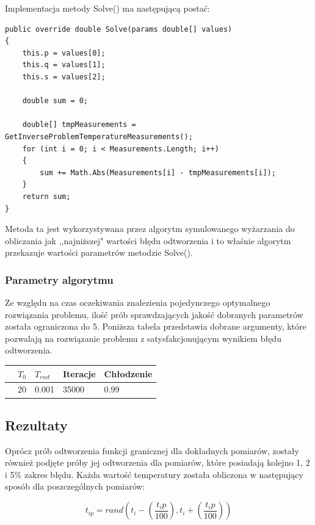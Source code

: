 \documentclass[twoside]{projektInzynierskiMS1}
\newcounter{rowcnt}
\newcommand\rownum{\ifnumequal{\value{rowcnt}}{0}{\textbf{Nr.}}{\therowcnt.}\refstepcounter{rowcnt}}
\newcommand{\si}{ś}
\begin{document}
Implementacja metody Solve() ma następującą postać:

\begin{verbatim}
public override double Solve(params double[] values)
{
    this.p = values[0];
    this.q = values[1];
    this.s = values[2];

    double sum = 0;

    double[] tmpMeasurements = GetInverseProblemTemperatureMeasurements();
    for (int i = 0; i < Measurements.Length; i++)
    {
        sum += Math.Abs(Measurements[i] - tmpMeasurements[i]);
    }
    return sum;
}
\end{verbatim}

Metoda ta jest wykorzystywana przez algorytm symulowanego wyżarzania do obliczania jak ,,najniższej" warto\si ci błędu odtworzenia i to wła\si nie algorytm przekazuje warto\si ci parametrów metodzie Solve().

\subsubsection{Parametry algorytmu}
Ze względu na czas oczekiwania znalezienia pojedynczego optymalnego rozwiązania problemu, ilo\si ć prób sprawdzających jako\si ć dobranych parametrów została ograniczona do 5. Poniższa tabela przedstawia dobrane argumenty, które pozwalają na rozwiązanie problemu z satysfakcjonującym wynikiem błędu odtworzenia. \\

\begin{tabularx}{\textwidth}{ | >{\rownum}c|X|X|X|X|} 
\hline
& \textbf{ $T_0$} &
 \textbf{ $T_{end}$} &
 \textbf{ Iteracje}&
 \textbf{ Chłodzenie}\\ \hline
& 20 & 0.001 & 35000 & 0.99 \\ \hline 
\end{tabularx}

\subsection{Rezultaty}

Oprócz prób odtworzenia funkcji granicznej dla dokładnych pomiarów, zostały również podjęte próby jej odtworzenia dla pomiarów, które posiadają kolejno 1, 2 i 5\% zakres błędu. Każda warto\si ć temperatury została obliczona w następujący sposób dla poszczególnych pomiarów:

\[ t_{ip} = rand\left(t_{i} - \left(\frac{t_{i} p}{100}\right), t_{i} +\left (\frac{t_{i} p}{100}\right)\right) \]
\end{document}
